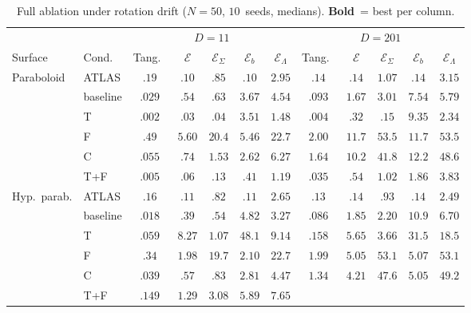 \documentclass[11pt]{article}
\newcommand{\cE}{\mathcal{E}}
\begin{document}
\begin{table}[ht]
\centering
\caption{Full ablation under rotation drift ($N{=}50$, $10$~seeds, medians).
\textbf{Bold}~= best per column.}
\label{tab:full-ablation-rot}
\footnotesize
\begin{tabular}{ll ccccc ccccc}
\toprule
 & & \multicolumn{5}{c}{$D{=}11$} & \multicolumn{5}{c}{$D{=}201$} \\
\cmidrule(lr){3-7} \cmidrule(lr){8-12}
Surface & Cond.\ & Tang.\ & $\cE$ & $\cE_\Sigma$
        & $\cE_b$ & $\cE_\Lambda$
        & Tang.\ & $\cE$ & $\cE_\Sigma$
        & $\cE_b$ & $\cE_\Lambda$ \\
\midrule
Paraboloid
 & ATLAS    & $.19$  & $.10$  & $.85$  & $\mathbf{.10}$ & $2.95$
            & $.14$  & $\mathbf{.14}$ & $1.07$ & $\mathbf{.14}$ & $3.15$ \\
 & baseline & $.029$ & $.54$  & $.63$  & $3.67$ & $4.54$
            & $.093$ & $1.67$ & $3.01$ & $7.54$ & $5.79$ \\
 & T        & $\mathbf{.002}$ & $\mathbf{.03}$ & $\mathbf{.04}$ & $3.51$ & $1.48$
            & $\mathbf{.004}$ & $.32$  & $\mathbf{.15}$ & $9.35$ & $\mathbf{2.34}$ \\
 & F        & $.49$  & $5.60$ & $20.4$ & $5.46$ & $22.7$
            & $2.00$ & $11.7$ & $53.5$ & $11.7$ & $53.5$ \\
 & C        & $.055$ & $.74$  & $1.53$ & $2.62$ & $6.27$
            & $1.64$ & $10.2$ & $41.8$ & $12.2$ & $48.6$ \\
 & T+F      & $.005$ & $.06$  & $.13$  & $.41$  & $\mathbf{1.19}$
            & $.035$ & $.54$  & $1.02$ & $1.86$ & $3.83$ \\
\midrule
Hyp.~parab.
 & ATLAS    & $.16$  & $\mathbf{.11}$ & $.82$  & $\mathbf{.11}$ & $\mathbf{2.65}$
            & $.13$  & $\mathbf{.14}$ & $.93$  & $\mathbf{.14}$ & $2.49$ \\
 & baseline & $\mathbf{.018}$ & $.39$  & $\mathbf{.54}$ & $4.82$ & $3.27$
            & $.086$ & $1.85$ & $2.20$ & $10.9$ & $6.70$ \\
 & T        & $.059$ & $8.27$ & $1.07$ & $48.1$ & $9.14$
            & $.158$ & $5.65$ & $3.66$ & $31.5$ & $18.5$ \\
 & F        & $.34$  & $1.98$ & $19.7$ & $2.10$ & $22.7$
            & $1.99$ & $5.05$ & $53.1$ & $5.07$ & $53.1$ \\
 & C        & $.039$ & $.57$  & $.83$  & $2.81$ & $4.47$
            & $1.34$ & $4.21$ & $47.6$ & $5.05$ & $49.2$ \\
 & T+F      & $.149$ & $1.29$ & $3.08$ & $5.89$ & $7.65$

\end{tabular}
\end{table}
\end{document}
